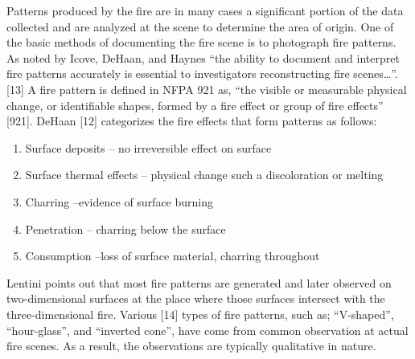 \documentclass[twoside]{uocthesis}
\begin{document}
Patterns produced by the fire are in many cases a significant portion of the data collected and are analyzed at the scene to determine the area of origin.  One of the basic methods of documenting the fire scene is to photograph fire patterns.  As noted by Icove, DeHaan, and Haynes  “the ability to document and interpret fire patterns accurately is essential to investigators reconstructing fire scenes…”. [13]  A fire pattern is defined in NFPA 921 as, “the visible or measurable physical change, or identifiable shapes, formed by a fire effect or group of fire effects” [921].  
DeHaan [12] categorizes the fire effects that form patterns as follows:
\begin{enumerate}
\item Surface deposits – no irreversible effect on surface
\item Surface thermal effects – physical change such a discoloration or melting
\item Charring –evidence of surface burning
\item Penetration – charring below the surface
\item Consumption –loss of surface material, charring throughout
\end{enumerate}
Lentini points out that most fire patterns are generated and later observed on two-dimensional surfaces at the place where those surfaces intersect with the three-dimensional fire. Various [14] types of fire patterns, such as; “V-shaped”, “hour-glass”, and “inverted cone”, have come from common observation at actual fire scenes.  As a result, the observations are typically qualitative in nature.   
\end{document}
